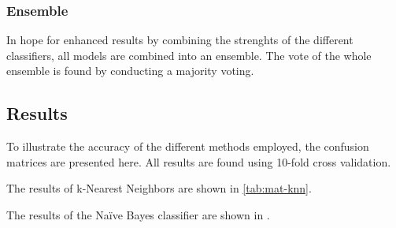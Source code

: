 \subsubsection*{Ensemble}
In hope for enhanced results by combining the strenghts of the
different classifiers, all models are combined into an ensemble. The
vote of the whole ensemble is found by conducting a majority voting.

\subsection{Results}
To illustrate the accuracy of the different methods employed, the
confusion matrices are presented here. All results are found using
10-fold cross validation.

The results of k-Nearest Neighbors are shown in \ref{tab:mat-knn}.

\begin{table}[H]
	\centering
	\caption{Confusion matrix of the k-Nearest Neighbors classifier with Manhattan distance}
	\label{tab:mat-knn}
\end{table}

The results of the Na\"ive Bayes classifier are shown in .
\begin{table}[H]
	\centering
	\caption{Confusion matrix of the Na\"ive Bayes classifier}
	\label{tab:mat-nb}
\end{table}

